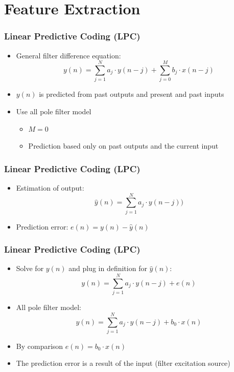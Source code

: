 \documentclass{beamer}
\begin{document}
\section{Feature Extraction} 

\begin{frame}
\frametitle{Linear Predictive Coding (LPC)}
\begin{block}{}
\begin{itemize}
	\item General filter difference equation: 
	$$y(n) = \sum_{j=1}^{N} a_j \cdot y(n-j) + \sum_{j=0}^{M} b_j \cdot x(n-j)$$
	\item $y(n)$ is predicted from past outputs and present and past inputs
	\item Use all pole filter model 
	\begin{itemize}
		\item $M = 0$
		\item Prediction based only on past outputs and the current input
	\end{itemize} 
\end{itemize}
\end{block}
\end{frame}


\begin{frame}
\frametitle{Linear Predictive Coding (LPC)}
\begin{block}{}
\begin{itemize}
	\item Estimation of output: 
	$$\hat{y}(n) = \sum_{j=1}^{N} a_j \cdot y(n-j))$$
	\item Prediction error: 
	$e(n) = y(n) - \hat{y}(n)$
\end{itemize}
\end{block}
\end{frame}


\begin{frame}
\frametitle{Linear Predictive Coding (LPC)}
\begin{block}{}
\begin{itemize}
	\item Solve for $y(n)$ and plug in definition for $\hat{y}(n)$: 
	$$y(n) = \sum_{j=1}^{N} a_j \cdot y(n-j) + e(n)$$
	\item All pole filter model:
	$$y(n) = \sum_{j=1}^{N} a_j \cdot y(n-j) + b_0 \cdot x(n)$$
	\item By comparison $e(n) = b_0 \cdot x(n)$
	\item The prediction error is a result of the input (filter excitation source)
\end{itemize}
\end{block}
\end{frame}
\end{document}
